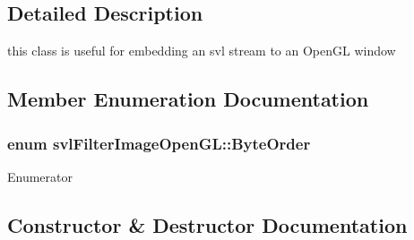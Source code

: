 \subsection{Detailed Description}
this class is useful for embedding an svl stream to an Open\+G\+L window 

\subsection{Member Enumeration Documentation}
\hypertarget{classsvl_filter_image_open_g_l_aebab8852e9b2fd8bc2fb69c7ce788d3f}{}
\subsubsection[{Byte\+Order}]{\setlength{\rightskip}{0pt plus 5cm}enum {\bf svl\+Filter\+Image\+Open\+G\+L\+::\+Byte\+Order}}\label{classsvl_filter_image_open_g_l_aebab8852e9b2fd8bc2fb69c7ce788d3f}
\begin{Desc}
\item[Enumerator]\par
\begin{description}
\item[{\em 
\hypertarget{classsvl_filter_image_open_g_l_aebab8852e9b2fd8bc2fb69c7ce788d3fa0a28f9264131c7b9b5ec54c0497091f3}{}R\+G\+B\+\_\+\+Order\label{classsvl_filter_image_open_g_l_aebab8852e9b2fd8bc2fb69c7ce788d3fa0a28f9264131c7b9b5ec54c0497091f3}
}]\item[{\em 
\hypertarget{classsvl_filter_image_open_g_l_aebab8852e9b2fd8bc2fb69c7ce788d3faf5fa66f50f54a7febaa882e293c97526}{}B\+G\+R\+\_\+\+Order\label{classsvl_filter_image_open_g_l_aebab8852e9b2fd8bc2fb69c7ce788d3faf5fa66f50f54a7febaa882e293c97526}
}]\end{description}
\end{Desc}


\subsection{Constructor \& Destructor Documentation}
\hypertarget{classsvl_filter_image_open_g_l_a8b772ba681346f079117e661f26551b7}{}
